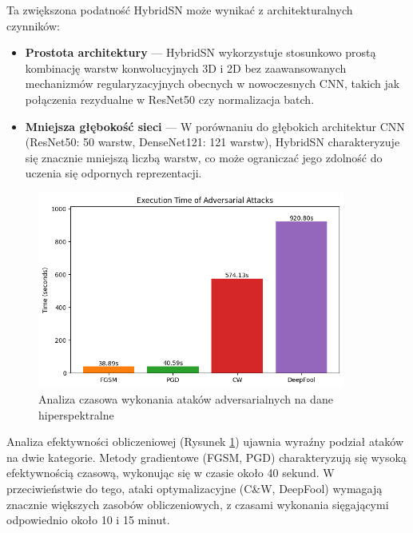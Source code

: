 \documentclass[12pt]{article}
\begin{document}
Ta zwiększona podatność HybridSN może wynikać z architekturalnych czynników:

\begin{itemize}
    \item \textbf{Prostota architektury} --- HybridSN wykorzystuje stosunkowo prostą kombinację warstw konwolucyjnych 3D i 2D bez zaawansowanych mechanizmów regularyzacyjnych obecnych w nowoczesnych CNN, takich jak połączenia rezydualne w ResNet50 czy normalizacja batch.
    
    \item \textbf{Mniejsza głębokość sieci} --- W porównaniu do głębokich architektur CNN (ResNet50: 50 warstw, DenseNet121: 121 warstw), HybridSN charakteryzuje się znacznie mniejszą liczbą warstw, co może ograniczać jego zdolność do uczenia się odpornych reprezentacji.
\end{itemize}

\begin{figure}[H]
    \centering
    \includegraphics[width=0.9\textwidth]{hybridsn_time.png} 
    \caption{Analiza czasowa wykonania ataków adversarialnych na dane hiperspektralne}
    \label{fig:hyperspectral-time}
\end{figure}

Analiza efektywności obliczeniowej (Rysunek \ref{fig:hyperspectral-time}) ujawnia wyraźny podział ataków na dwie kategorie. Metody gradientowe (FGSM, PGD) charakteryzują się wysoką efektywnością czasową, wykonując się w czasie około 40 sekund. W przeciwieństwie do tego, ataki optymalizacyjne (C\&W, DeepFool) wymagają znacznie większych zasobów obliczeniowych, z czasami wykonania sięgającymi odpowiednio około 10 i 15 minut.
\end{document}
